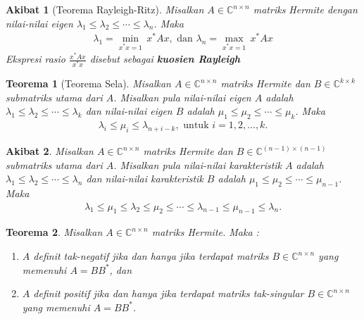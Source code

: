 \documentclass[11pt,a4paper]{article}
\newcommand{\ds}{\displaystyle}
\theoremstyle{plain}
\newtheorem{theorem}{Teorema}[section]
\newtheorem{cor}{Akibat}[theorem]
\theoremstyle{definition}
\theoremstyle{remark}
\begin{document}
\begin{enumerate}
	
	\begin{bfseries}
		\begin{cor}[Teorema Rayleigh-Ritz]
			Misalkan $A\in \mathbb{C}^{n\times n}$ matriks Hermite dengan nilai-nilai eigen $\lambda_{1}\le \lambda_{2}\le \cdots\le \lambda_{n}$. Maka 
			\begin{align*}
			\ds \lambda_{1} = \min_{x^{\ast}x=1}\, x^{\ast}Ax , \text{ dan } \lambda_{n}= \max_{x^{\ast}x=1}\, x^{\ast}Ax
			\end{align*}
			Ekspresi rasio $\ds \frac{x^{\ast}Ax}{x^{\ast}x}$ disebut sebagai \textbf{kuosien Rayleigh}
		\end{cor}
	\end{bfseries}

	
	\begin{bfseries}
		\begin{theorem}[Teorema Sela]
			Misalkan $A\in \mathbb{C}^{n\times n}$ matriks Hermite dan $B\in \mathbb{C}^{k\times k}$ submatriks utama dari $A$. Misalkan pula nilai-nilai eigen $A$ adalah $\lambda_{1}\le \lambda_{2}\le \cdots\le \lambda_{k}$ dan nilai-nilai eigen $B$ adalah $\mu_{1}\le \mu_{2}\le \cdots\le \mu_{k}$. Maka 
			\begin{align*}
			\ds \lambda_{i}\leq \mu_{i}\leq \lambda_{n+i-k} , \text{ untuk } i=1,2,\ldots ,k.
			\end{align*}
		\end{theorem}
	\end{bfseries}

	\begin{bfseries}
		\begin{cor}
			Misalkan $A\in \mathbb{C}^{n\times n}$ matriks Hermite dan $B\in \mathbb{C}^{(n-1)\times (n-1)}$ submatriks utama dari $A$. Misalkan pula nilai-nilai karakteristik $A$ adalah $\lambda_{1}\le \lambda_{2}\le \cdots\le \lambda_{n}$ dan nilai-nilai karakteristik $B$ adalah $\mu_{1}\le \mu_{2}\le \cdots\le \mu_{n-1}$. Maka 
			\begin{align*}
			\ds \lambda_{1}\leq \mu_{1}\leq \lambda_{2}\leq \mu_{2}\leq \cdots \leq \lambda_{n-1} \leq \mu_{n-1} \leq \lambda_{n}.
			\end{align*}
		\end{cor}
	\end{bfseries}

	\begin{bfseries}
		\begin{theorem}
			Misalkan $A\in \mathbb{C}^{n\times n}$ matriks Hermite. Maka :
			\begin{enumerate}
				\item[(a)] $A$ definit tak-negatif jika dan hanya jika terdapat matriks $B\in \mathbb{C}^{n\times n}$ yang memenuhi $A=BB^{\ast}$, dan  
				\item[(b)] $A$ definit positif jika dan hanya jika terdapat matriks tak-singular $B\in \mathbb{C}^{n\times n}$ yang memenuhi $A=BB^{\ast}$. 
			\end{enumerate}
		\end{theorem}
	\end{bfseries}


\end{enumerate}
\end{document}
